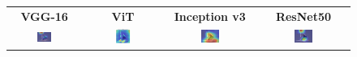\documentclass[a4paper,12pt]{report}
\begin{document}
\begin{figure}[H]
    \centering
    \setlength{\tabcolsep}{1pt}
    \begin{tabular}{cccc}
    \textbf{VGG-16} & \textbf{ViT} & \textbf{Inception v3} & \textbf{ResNet50} \\
    
    \includegraphics[width=0.22\textwidth]{images/appendix/modelgraph/vgg/correct/Slaty_Backed_Gull/011sm.jpg} &
    \includegraphics[width=0.22\textwidth]{images/appendix/modelgraph/vit/correct/Slaty_Backed_Gull/011sm.jpg} &
    \includegraphics[width=0.22\textwidth]{images/appendix/modelgraph/inception/correct/Slaty_Backed_Gull/011sm.jpg} &
    \includegraphics[width=0.22\textwidth]{images/appendix/modelgraph/resnet/correct/Slaty_Backed_Gull/011sm.jpg} \\
    \end{tabular}

    \label{fig:interpretability_slaty_1}
\end{figure}
\end{document}
